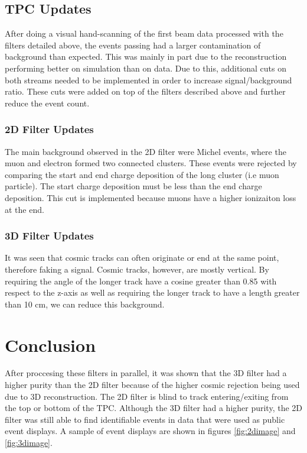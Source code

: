 \subsection{TPC Updates}
After doing a visual hand-scanning of the first beam data processed with the filters detailed above, the events passing had a larger contamination of background than expected. This was mainly in part due to the reconstruction performing better on simulation than on data. Due to this, additional cuts on both streams needed to be implemented in order to increase signal/background ratio. These cuts were added on top of the filters described above and further reduce the event count. 
\subsubsection{2D Filter Updates}
The main background observed in the 2D filter were Michel events, where the muon and electron formed two connected clusters. These events were rejected by comparing the start and end charge deposition of the long cluster (i.e muon particle). The start charge deposition must be less than the end charge deposition. This cut is implemented because muons have a higher ionizaiton loss at the end. 
\subsubsection{3D Filter Updates}
It was seen that cosmic tracks can often originate or end at the same point, therefore faking a signal. Cosmic tracks, however, are mostly vertical. By requiring the angle of the longer track have a cosine greater than 0.85 with respect to the z-axis as well as requiring the longer track to have a length greater than 10 cm, we can reduce this background. 
\section{Conclusion}
After proccesing these filters in parallel, it was shown that the 3D filter had a higher purity than the 2D filter because of the higher cosmic rejection being used due to 3D reconstruction. The 2D filter is blind to track entering/exiting from the top or bottom of the TPC. Although the 3D filter had a higher purity, the 2D filter was still able to find identifiable events in data that were used as public event displays. A sample of event displays are shown in figures \ref{fig:2dimage} and \ref{fig:3dimage}.
